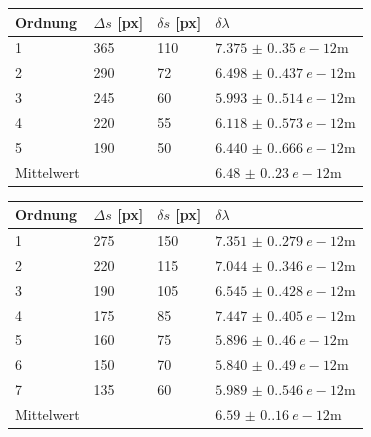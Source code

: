 \begin{minipage}{\linewidth}
    \begin{table}[H]
        \centering
    \begin{tabular}{llll}
        \toprule
        Ordnung & $ \Delta s $ [px] & $ \delta s $ [px] & $ \delta \lambda $ \\
        \midrule
        1 & 365 & 110 &  $ \SI[separate-uncertainty=true]{7.375(0.350)}{e-12\metre} $ \\
        2 & 290 & 72  &  $ \SI[separate-uncertainty=true]{6.498(0.437)}{e-12\metre} $ \\
        3 & 245 & 60  &  $ \SI[separate-uncertainty=true]{5.993(0.514)}{e-12\metre} $ \\
        4 & 220 & 55  &  $ \SI[separate-uncertainty=true]{6.118(0.573)}{e-12\metre} $ \\
        5 & 190 & 50  &  $ \SI[separate-uncertainty=true]{6.440(0.666)}{e-12\metre} $ \\
        \midrule
        Mittelwert & & & $ \SI[separate-uncertainty=true]{6.48(0.23)}{e-12\metre} $ \\
        \bottomrule   
    \end{tabular}
    
    \label{tab:Wellerot}
\end{table}
\end{minipage}

\begin{minipage}{\linewidth}
    \begin{table}[H]
        \centering
    \begin{tabular}{llll}
        \toprule
        Ordnung & $ \Delta s $ [px] & $ \delta s $ [px] & $ \delta \lambda $ \\
        \midrule
        1 & 275 & 150 &  $ \SI[separate-uncertainty=true]{7.351(0.279)}{e-12\metre} $ \\
        2 & 220 & 115  &  $ \SI[separate-uncertainty=true]{7.044(0.346)}{e-12\metre} $ \\
        3 & 190 & 105  &  $ \SI[separate-uncertainty=true]{6.545(0.428)}{e-12\metre} $ \\
        4 & 175 & 85  &  $ \SI[separate-uncertainty=true]{7.447(0.405)}{e-12\metre} $ \\
        5 & 160 & 75  &  $ \SI[separate-uncertainty=true]{5.896(0.460)}{e-12\metre} $ \\
        6 & 150 & 70  &  $ \SI[separate-uncertainty=true]{5.840(0.490)}{e-12\metre} $ \\
        7 & 135 & 60  &  $ \SI[separate-uncertainty=true]{5.989(0.546)}{e-12\metre} $ \\
        \midrule
        Mittelwert & & & $ \SI[separate-uncertainty=true]{6.59(0.16)}{e-12\metre} $ \\
        \bottomrule   
    \end{tabular}
    
    \label{tab:Welleblau}
\end{table}
\end{minipage}


